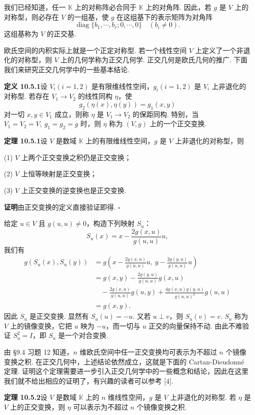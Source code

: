 \documentclass[UTF8,12pt,a4paper,fontset=fandol]{ctexart}
\begin{document}
我们已经知道，任一 $\mathbb K$ 上的对称阵必合同于 $\mathbb K$ 上的对角阵. 因此，若 $g$ 是 $V$ 上的对称型，则必存在 $V$ 的一组基，使 $g$ 在这组基下的表示矩阵为对角阵
\[
  \operatorname{diag}\{b_1,\cdots,b_r;0,\cdots,0\}\quad (b_i\ne0).
\]
这组基称为 $V$ 的正交基.

欧氏空间的内积实际上就是一个正定对称型. 若一个线性空间 $V$ 上定义了一个非退化的对称型，则 $V$ 上的几何学称为正交几何学. 正交几何是欧氏几何的推广. 下面我们来研究正交几何学中的一些基本结论.

\noindent\textbf{定义 10.5.1}\quad 设 $V_i(i=1,2)$ 是有限维线性空间，$g_i(i=1,2)$ 是 $V_i$ 上非退化的对称型. 若存在 $V_1\to V_2$ 的线性同构 $\eta$，使
\[
  g_2(\eta(x),\eta(y))=g_1(x,y)
\]
对一切 $x,y\in V_1$ 成立，则称 $\eta$ 是 $V_1\to V_2$ 的保距同构. 特别，当 $V_1=V_2=V,\ g_1=g_2=g$ 时，则 $\eta$ 称为 $(V,g)$ 上的一个正交变换.

\noindent\textbf{定理 10.5.1}\quad 设 $V$ 是数域 $\mathbb K$ 上的有限维线性空间，$g$ 是 $V$ 上非退化的对称型，则

(1) $V$ 上两个正交变换之积仍是正交变换；

(2) $V$ 上恒等映射是正交变换；

(3) $V$ 上正交变换的逆变换也是正交变换.

\noindent\textbf{证明}\quad 由正交变换的定义直接验证即得. $\square$

给定 $u\in V$ 且 $g(u,u)\ne0$，构造下列映射 $S_u$：
\[
  S_u(x)=x-\frac{2g(x,u)}{g(u,u)}u,
\]
我们有
\[
\begin{aligned}
  g(S_u(x),S_u(y))
  &=g\left(x-\frac{2g(x,u)}{g(u,u)}u,\ y-\frac{2g(y,u)}{g(u,u)}u\right)\\
  &=g(x,y)-\frac{2g(y,u)}{g(u,u)}g(x,u)\\
  &\quad-\frac{2g(x,u)}{g(u,u)}g(u,y)
  +\frac{4g(x,u)g(y,u)}{g(u,u)^2}g(u,u)\\
  &=g(x,y).
\end{aligned}
\]
因此 $S_u$ 是正交变换. 显然有 $S_u(u)=-u$. 又若 $u\perp v$，则 $S_u(v)=v$. $S_u$ 称为 $V$ 上的镜像变换，它把 $u$ 映为 $-u$，而一切与 $u$ 正交的向量保持不动. 由此不难验证 $S_u^2=I$，即 $S_u$ 是一个对合变换.

由 §9.4 习题 12 知道，$n$ 维欧氏空间中任一正交变换均可表示为不超过 $n$ 个镜像变换之积. 在正交几何中，上述结论依然成立，这就是下面的 Cartan-Dieudonné 定理. 证明这个定理需要进一步引入正交几何学中的一些概念和结论，因此在这里我们就不给出相应的证明了，有兴趣的读者可以参考 [4].

\noindent\textbf{定理 10.5.2}\quad 设 $V$ 是数域 $\mathbb K$ 上的 $n$ 维线性空间，$g$ 是 $V$ 上非退化的对称型. 若 $\eta$ 是 $V$ 上的正交变换，则 $\eta$ 可以表示为不超过 $n$ 个镜像变换之积.
\end{document}
